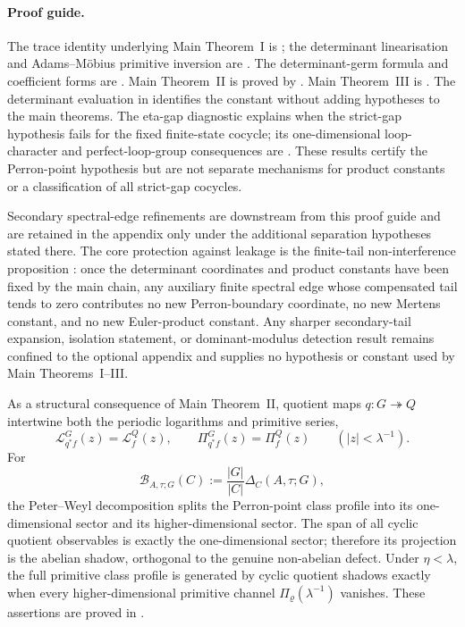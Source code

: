 \paragraph{Proof guide.}
  The trace identity underlying Main Theorem~I is
  ; the determinant linearisation and
  Adams--M\"obius primitive inversion are
  .
  The determinant-germ formula and coefficient forms are
  .  Main Theorem~II is proved by
  .  Main Theorem~III is
  . The determinant evaluation in
  identifies the constant without adding hypotheses to the main theorems.
  The eta-gap diagnostic  explains when the
  strict-gap hypothesis fails for the fixed finite-state cocycle; its one-dimensional loop-character and
  perfect-loop-group consequences are
  .
  These results certify the Perron-point hypothesis but are not separate
  mechanisms for product constants or a classification of all strict-gap
  cocycles.

  Secondary spectral-edge refinements are downstream from this proof guide and
  are retained in the appendix only under the additional separation hypotheses
  stated there.
  The core protection against leakage is the finite-tail non-interference
  proposition : once the
  determinant coordinates and product constants have been fixed by the main
  chain, any auxiliary finite spectral edge whose compensated tail tends to
  zero contributes no new Perron-boundary coordinate, no new Mertens constant,
  and no new Euler-product constant.  Any sharper secondary-tail expansion,
  isolation statement, or dominant-modulus detection result remains confined to
  the optional appendix and supplies no hypothesis or constant used by Main
  Theorems~I--III.

As a structural consequence of Main Theorem~II, quotient maps
\(q:G\twoheadrightarrow Q\) intertwine both the periodic logarithms and
primitive series,
\[
  \mathcal L_{q^\ast f}^{G}(z)=\mathcal L_f^{Q}(z),
  \qquad
  \Pi_{q^\ast f}^{G}(z)=\Pi_f^{Q}(z)
  \qquad(|z|<\lambda^{-1}).
\]
For
\[
  \mathcal B_{A,\tau;G}(C):=\frac{|G|}{|C|}\Delta_C(A,\tau;G),
\]
the Peter--Weyl decomposition splits the Perron-point class profile into
its one-dimensional sector and its higher-dimensional sector. The span of
all cyclic quotient observables is exactly the one-dimensional sector;
therefore its projection is the abelian shadow, orthogonal to the genuine
non-abelian defect. Under \(\eta<\lambda\), the full primitive class
profile is generated by cyclic quotient shadows exactly when every
higher-dimensional primitive channel
\(\Pi_\varrho(\lambda^{-1})\) vanishes. These assertions are proved in
.

